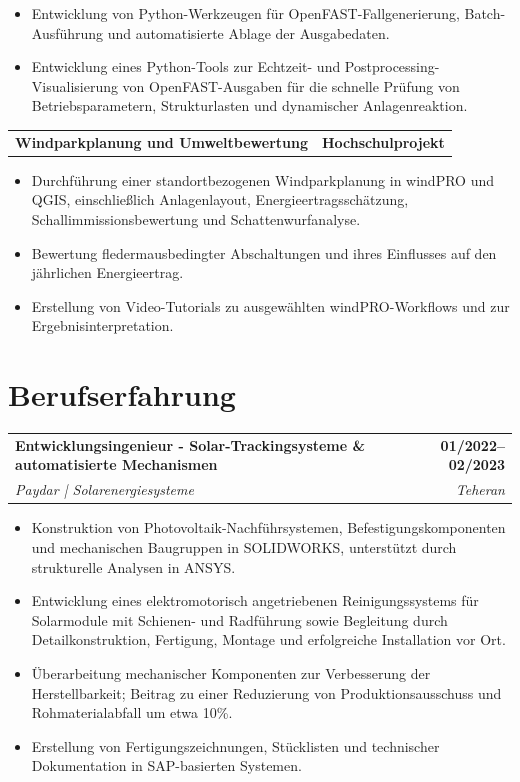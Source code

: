 \documentclass[10pt,a4paper]{article}
\makeatletter
\newcommand{\cvjob}[4]{%
  \begin{tabularx}{\linewidth}{@{}Xr@{}}
    \textbf{#1} & \textbf{#2}\\[1pt]
    \textit{#3} & \textit{#4}
  \end{tabularx}
  \vspace{0.05em}
}
\newcommand{\cvproject}[2]{%
  \begin{tabularx}{\linewidth}{@{}Xr@{}}
    \textbf{#1} & \textbf{#2}
  \end{tabularx}
  \vspace{0.08em}
}
\makeatother
\begin{document}
\begin{itemize}
  \item Entwicklung von Python-Werkzeugen für OpenFAST-Fallgenerierung, Batch-Ausführung und automatisierte Ablage der Ausgabedaten.

  \item Entwicklung eines Python-Tools zur Echtzeit- und Postprocessing-Visualisierung von OpenFAST-Ausgaben für die schnelle Prüfung von Betriebsparametern, Strukturlasten und dynamischer Anlagenreaktion.
\end{itemize}
\vspace{1pt}
\cvproject{Windparkplanung und Umweltbewertung}{Hochschulprojekt}
\begin{itemize}
  \item Durchführung einer standortbezogenen Windparkplanung in windPRO und QGIS, einschließlich Anlagenlayout, Energieertragsschätzung, Schallimmissionsbewertung und Schattenwurfanalyse.

  \item Bewertung fledermausbedingter Abschaltungen und ihres Einflusses auf den jährlichen Energieertrag.

  \item Erstellung von Video-Tutorials zu ausgewählten windPRO-Workflows und zur Ergebnisinterpretation.
\end{itemize}

\newpage

\section{Berufserfahrung}
\cvjob{Entwicklungsingenieur - Solar-Trackingsysteme \& automatisierte Mechanismen}{01/2022--02/2023}{Paydar | Solarenergiesysteme}{Teheran}
\begin{itemize}
  \item Konstruktion von Photovoltaik-Nachführsystemen, Befestigungskomponenten und mechanischen Baugruppen in SOLIDWORKS, unterstützt durch strukturelle Analysen in ANSYS.
  \item Entwicklung eines elektromotorisch angetriebenen Reinigungssystems für Solarmodule mit Schienen- und Radführung sowie Begleitung durch Detailkonstruktion, Fertigung, Montage und erfolgreiche Installation vor Ort.
  \item Überarbeitung mechanischer Komponenten zur Verbesserung der Herstellbarkeit; Beitrag zu einer Reduzierung von Produktionsausschuss und Rohmaterialabfall um etwa 10\%.
  \item Erstellung von Fertigungszeichnungen, Stücklisten und technischer Dokumentation in SAP-basierten Systemen.
\end{itemize}
\end{document}
